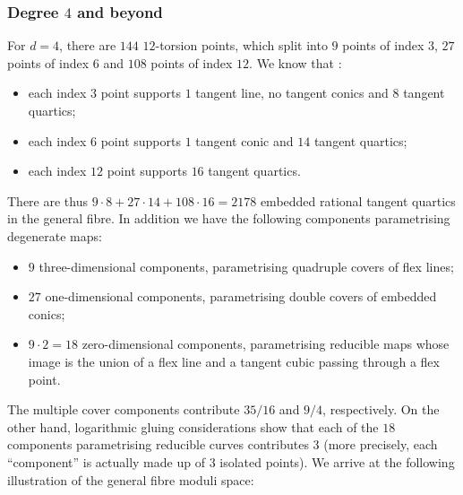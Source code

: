 \documentclass[11pt]{amsart}
\theoremstyle{definition}
\theoremstyle{definition}
\begin{document}
\subsubsection{Degree $4$ and beyond} For $d=4$, there are $144$ $12$-torsion points, which split into $9$ points of index $3$, $27$ points of index $6$ and $108$ points of index $12$. We know that \cite{TakahashiCurvesComplement}:
\begin{itemize}
\item each index $3$ point supports $1$ tangent line, no tangent conics and $8$ tangent quartics;
\item each index $6$ point supports $1$ tangent conic and $14$ tangent quartics;
\item each index $12$ point supports $16$ tangent quartics.	
\end{itemize}
There are thus $9 \cdot 8 + 27 \cdot 14 + 108 \cdot 16 =  2178$ embedded rational tangent quartics in the general fibre. In addition we have the following components parametrising degenerate maps:
\begin{itemize}
\item $9$ three-dimensional components, parametrising quadruple covers of flex lines;
\item $27$ one-dimensional components, parametrising double covers of embedded conics;
\item $9\cdot 2 = 18$ zero-dimensional components, parametrising reducible maps whose image is the union of a flex line and a tangent cubic passing through a flex point.
\end{itemize}
The multiple cover components contribute $35/16$ and $9/4$, respectively. On the other hand, logarithmic gluing considerations \cite{CvGKTDegenerateContributions} show that each of the $18$ components parametrising reducible curves contributes $3$ (more precisely, each ``component'' is actually made up of $3$ isolated points). We arrive at the following illustration of the general fibre moduli space:
\end{document}
